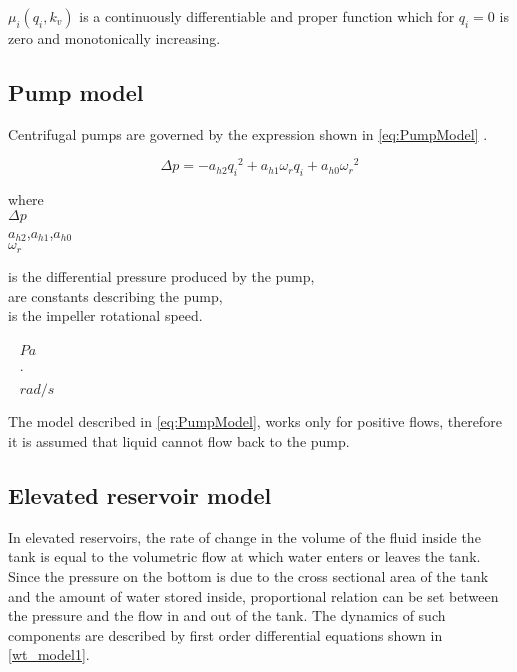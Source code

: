 $\mu_i(q_i,k_v)$ is a continuously differentiable and proper function which for $q_i = 0$ is zero and monotonically increasing.

\subsection{Pump model}
\label{pump_component}

Centrifugal pumps are governed by the expression shown in \eqref{eq:PumpModel} \cite{kallesoePHD}.

\begin{equation}
  \Delta p = -a_{h2}{q_i}^2 + a_{h1} \omega_r q_i + a_{h0}{\omega_r}^2
  \label{eq:PumpModel}
\end{equation}

\begin{minipage}[t]{0.20\textwidth}
where\\
\hspace*{8mm} $\Delta p$ \\
\hspace*{8mm} $a_{h2}$,$a_{h1}$,$a_{h0}$ \\
\hspace*{8mm} $\omega_r$ 

\end{minipage}
\begin{minipage}[t]{0.68\textwidth}
\vspace*{2mm}
is the differential pressure produced by the pump,\\
are constants describing the pump,\\
is the impeller rotational speed.
\end{minipage}
\begin{minipage}[t]{0.10\textwidth}
\vspace*{2mm}
\textcolor{White}{te}$\unit{Pa}$\\
\textcolor{White}{te}$\unit{\cdot}$\\
\textcolor{White}{te}$\unit{rad/s}$
\end{minipage}  

The model described in \eqref{eq:PumpModel}, works only for positive flows, therefore it is assumed that liquid cannot flow back to the pump. 

\subsection{Elevated reservoir model}
\label{elevatedreservoir_component}

In elevated reservoirs, the rate of change in the volume of the fluid inside the tank is equal to the volumetric flow at which water enters or leaves the tank. Since the pressure on the bottom is due to the cross sectional area of the tank and the amount of water stored inside, proportional relation can be set between the pressure and the flow in and out of the tank. The dynamics of such components are described by first order differential equations shown in \eqref{wt_model1}.


